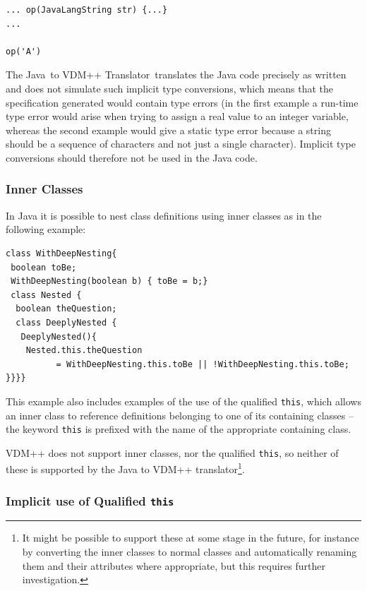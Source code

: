 \documentclass[\pformat,12pt]{article}
\newcommand{\JAVA}{Java}
\newcommand{\TjTov}{The \JAVA\ to VDM++ Translator}
\begin{document}
\begin{small}
\begin{verbatim}
... op(JavaLangString str) {...}
...

op('A')
\end{verbatim}
\end{small}

\TjTov\ translates the Java code precisely as written and does not
simulate such implicit type conversions, which means that the
specification generated would contain type errors (in the first
example a run-time type error would arise when trying to assign a real
value to an integer variable, whereas the second example would give a
static type error because a string should be a sequence of characters
and not just a single character). Implicit type conversions should
therefore not be used in the Java code.

\subsubsection{Inner Classes}

In Java it is possible to nest class definitions using inner classes
as in the following example: 

\begin{small}
\begin{verbatim}
class WithDeepNesting{
 boolean toBe;
 WithDeepNesting(boolean b) { toBe = b;}
 class Nested {
  boolean theQuestion;
  class DeeplyNested {
   DeeplyNested(){
    Nested.this.theQuestion
          = WithDeepNesting.this.toBe || !WithDeepNesting.this.toBe; }}}}
\end{verbatim}
\end{small}

This example also includes examples of the use of the qualified
\texttt{this}, which allows an inner class to reference definitions
belonging to one of its containing classes -- the keyword
\texttt{this} is prefixed with the name of the appropriate containing
class. 

VDM++ does not support inner classes, nor the qualified \texttt{this},
so neither of these is supported by the Java to VDM++
translator\footnote{It might be possible to support these
  at some stage in the future, for instance by converting the inner
  classes to normal classes and automatically renaming them and
  their attributes where appropriate, but this requires further
  investigation.}.


\subsubsection{Implicit use of Qualified \texttt{this}}
\end{document}
